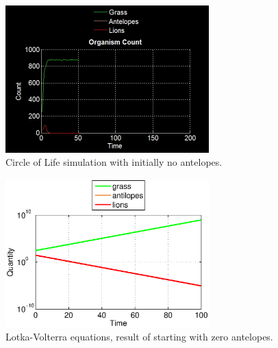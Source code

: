 \documentclass[11pt]{article}
\begin{document}
\begin{figure}
\centering
\includegraphics[width=0.7\textwidth]{noAntelopesOnlyCount.png}
\caption{Circle of Life simulation with initially no antelopes.}
\label{fig:noAntelopes}
\end{figure}
\begin{figure}
\centering
\includegraphics[width=0.7\textwidth]{LotkaVolterraNoAntelopes.eps}
\caption{Lotka-Volterra equations, result of starting with zero antelopes.}
\label{fig:LotkaNoAntelopes}
\end{figure}
\end{document}

